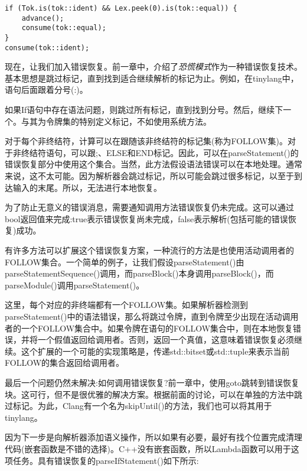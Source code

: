 \begin{lstlisting}[caption={}]
if (Tok.is(tok::ident) && Lex.peek(0).is(tok::equal)) {
	advance();
	consume(tok::equal);
}
consume(tok::ident);
\end{lstlisting}

现在，让我们加入错误恢复。前一章中，介绍了\textit{恐慌模式}作为一种错误恢复技术。基本思想是跳过标记，直到找到适合继续解析的标记为止。例如，在tinylang中，语句后面跟着分号(:)。\par

如果If语句中存在语法问题，则跳过所有标记，直到找到分号。然后，继续下一个。与其为令牌集的特别定义标记，不如使用系统方法。\par

对于每个非终结符，计算可以在跟随该非终结符的标记集(称为FOLLOW集)。对于非终结符语句，可以跟;、ELSE和END标记。因此，可以在parseStatement()的错误恢复部分中使用这个集合。当然，此方法假设语法错误可以在本地处理。通常来说，这不太可能。因为解析器会跳过标记，所以可能会跳过很多标记，以至于到达输入的末尾。所以，无法进行本地恢复。\par

为了防止无意义的错误消息，需要通知调用方法错误恢复仍未完成。这可以通过bool返回值来完成:true表示错误恢复尚未完成，false表示解析(包括可能的错误恢复)成功。\par

有许多方法可以扩展这个错误恢复方案，一种流行的方法是也使用活动调用者的FOLLOW集合。一个简单的例子，让我们假设parseStatement()由parseStatementSequence()调用，而parseBlock()本身调用parseBlock()，而parseModule()调用parseStatement()。\par

这里，每个对应的非终端都有一个FOLLOW集。如果解析器检测到parseStatement()中的语法错误，那么将跳过令牌，直到令牌至少出现在活动调用者的一个FOLLOW集合中。如果令牌在语句的FOLLOW集合中，则在本地恢复错误，并将一个假值返回给调用者。否则，返回一个真值，这意味着错误恢复必须继续。这个扩展的一个可能的实现策略是，传递std::bitset或std::tuple来表示当前FOLLOW的集合返回给调用者。\par

最后一个问题仍然未解决:如何调用错误恢复?前一章中，使用goto跳转到错误恢复块。这可行，但不是很优雅的解决方案。根据前面的讨论，可以在单独的方法中跳过标记。为此，Clang有一个名为skipUntil()的方法，我们也可以将其用于tinylang。\par

因为下一步是向解析器添加语义操作，所以如果有必要，最好有找个位置完成清理代码(嵌套函数是不错的选择)。C++没有嵌套函数，所以Lambda函数可以用于这项任务。具有错误恢复的parseIfStatement()如下所示:\par


